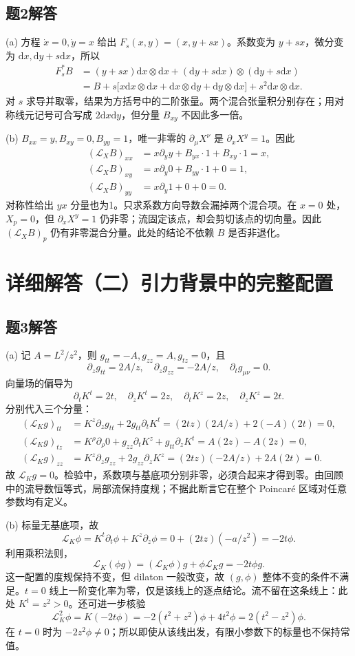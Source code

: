 \documentclass[11pt,a4paper]{article}
\newcommand{\D}{\mathrm d}\newcommand{\Lie}{\mathcal L}
\newcommand{\head}[1]{\section*{\color{teal}#1}}
\begin{document}
\subsection*{题2解答}
(a) 方程 $\dot x=0,\dot y=x$ 给出 $F_s(x,y)=(x,y+sx)$。系数变为 $y+sx$，微分变为 $\D x,\D y+s\D x$，所以
\begin{align*}
 F_s^*B&=(y+sx)\D x\otimes\D x
 +(\D y+s\D x)\otimes(\D y+s\D x)\\
 &=B+s\bigl[x\D x\otimes\D x+\D x\otimes\D y+\D y\otimes\D x\bigr]
 +s^2\D x\otimes\D x.
\end{align*}
对 $s$ 求导并取零，结果为方括号中的二阶张量。两个混合张量积分别存在；用对称线元记号可合写成 $2\D x\D y$，但分量 $B_{xy}$ 不因此多一倍。

(b) $B_{xx}=y,B_{xy}=0,B_{yy}=1$，唯一非零的 $\partial_\mu X^\nu$ 是 $\partial_xX^y=1$。因此
\begin{align*}
 (\Lie_XB)_{xx}&=x\partial_y y+B_{yx}\cdot1+B_{xy}\cdot1=x,\\
 (\Lie_XB)_{xy}&=x\partial_y0+B_{yy}\cdot1+0=1,\\
 (\Lie_XB)_{yy}&=x\partial_y1+0+0=0.
\end{align*}
对称性给出 $yx$ 分量也为1。只求系数方向导数会漏掉两个混合项。在 $x=0$ 处，$X_p=0$，但 $\partial_xX^y=1$ 仍非零；流固定该点，却会剪切该点的切向量。因此 $(\Lie_XB)_p$ 仍有非零混合分量。此处的结论不依赖 $B$ 是否非退化。
\newpage
\head{详细解答（二）\quad 引力背景中的完整配置}
\subsection*{题3解答}
(a) 记 $A=L^2/z^2$，则 $g_{tt}=-A,g_{zz}=A,g_{tz}=0$，且
\[
 \partial_z g_{tt}=2A/z,\quad \partial_zg_{zz}=-2A/z,
 \quad\partial_tg_{\mu\nu}=0.
\]
向量场的偏导为
\[
 \partial_tK^t=2t,\quad\partial_zK^t=2z,\quad
 \partial_tK^z=2z,\quad\partial_zK^z=2t.
\]
分别代入三个分量：
\begin{align*}
 (\Lie_Kg)_{tt}
 &=K^z\partial_zg_{tt}+2g_{tt}\partial_tK^t
 =(2tz)(2A/z)+2(-A)(2t)=0,\\
 (\Lie_Kg)_{tz}
 &=K^\rho\partial_\rho0+g_{zz}\partial_tK^z+g_{tt}\partial_zK^t
 =A(2z)-A(2z)=0,\\
 (\Lie_Kg)_{zz}
 &=K^z\partial_zg_{zz}+2g_{zz}\partial_zK^z
 =(2tz)(-2A/z)+2A(2t)=0.
\end{align*}
故 $\Lie_Kg=0$。检验中，系数项与基底项分别非零，必须合起来才得到零。由回顾中的流导数恒等式，局部流保持度规；不据此断言它在整个 Poincar\'e 区域对任意参数均有定义。

(b) 标量无基底项，故
\[
 \Lie_K\phi=K^t\partial_t\phi+K^z\partial_z\phi
 =0+(2tz)(-a/z^2)=-2t\phi.
\]
利用乘积法则，
\[
 \Lie_K(\phi g)=(\Lie_K\phi)g+\phi\Lie_Kg=-2t\phi g.
\]
这一配置的度规保持不变，但 dilaton 一般改变，故 $(g,\phi)$ 整体不变的条件不满足。$t=0$ 线上一阶变化率为零，仅是该线上的逐点结论。流不留在这条线上：此处 $K^t=z^2>0$。还可进一步核验
\[
 \Lie_K^2\phi=K(-2t\phi)
 =-2(t^2+z^2)\phi+4t^2\phi=2(t^2-z^2)\phi.
\]
在 $t=0$ 时为 $-2z^2\phi\ne0$；所以即使从该线出发，有限小参数下的标量也不保持常值。
\end{document}
